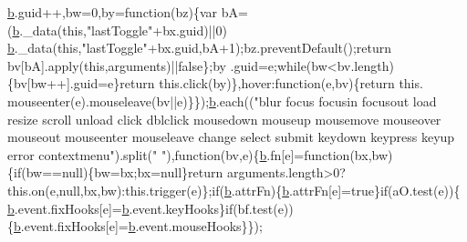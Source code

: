 \begin{DoxyCode}
      \hyperlink{docs_2_programmer's_manual_2html_2jquery_8js_aa4026ad5544b958e54ce5e106fa1c805}{b}.guid++,bw=0,by=\textcolor{keyword}{function}(bz)\{var bA=(\hyperlink{docs_2_programmer's_manual_2html_2jquery_8js_aa4026ad5544b958e54ce5e106fa1c805}{b}.\_data(\textcolor{keyword}{this},\textcolor{stringliteral}{"lastToggle"}+bx.guid)||0)%
      \hyperlink{docs_2_programmer's_manual_2html_2jquery_8js_aa4026ad5544b958e54ce5e106fa1c805}{b}.\_data(\textcolor{keyword}{this},\textcolor{stringliteral}{"lastToggle"}+bx.guid,bA+1);bz.preventDefault();\textcolor{keywordflow}{return} bv[bA].apply(\textcolor{keyword}{this},arguments)||\textcolor{keyword}{false}\};by
      .guid=e;\textcolor{keywordflow}{while}(bw<bv.length)\{bv[bw++].guid=e\}\textcolor{keywordflow}{return} this.click(by)\},hover:\textcolor{keyword}{function}(e,bv)\{\textcolor{keywordflow}{return} this.
      mouseenter(e).mouseleave(bv||e)\}\});\hyperlink{docs_2_programmer's_manual_2html_2jquery_8js_aa4026ad5544b958e54ce5e106fa1c805}{b}.each((\textcolor{stringliteral}{"blur focus focusin focusout load resize scroll unload click dblclick
       mousedown mouseup mousemove mouseover mouseout mouseenter mouseleave change select submit keydown keypress
       keyup error contextmenu"}).split(\textcolor{stringliteral}{" "}),\textcolor{keyword}{function}(bv,e)\{\hyperlink{docs_2_programmer's_manual_2html_2jquery_8js_aa4026ad5544b958e54ce5e106fa1c805}{b}.fn[e]=\textcolor{keyword}{function}(bx,bw)\{\textcolor{keywordflow}{if}(bw==null)\{bw=bx;bx=null\}\textcolor{keywordflow}{return} 
      arguments.length>0?this.on(e,null,bx,bw):this.trigger(e)\};\textcolor{keywordflow}{if}(\hyperlink{docs_2_programmer's_manual_2html_2jquery_8js_aa4026ad5544b958e54ce5e106fa1c805}{b}.attrFn)\{\hyperlink{docs_2_programmer's_manual_2html_2jquery_8js_aa4026ad5544b958e54ce5e106fa1c805}{b}.attrFn[e]=\textcolor{keyword}{true}\}\textcolor{keywordflow}{if}(aO.test(e))\{
      \hyperlink{docs_2_programmer's_manual_2html_2jquery_8js_aa4026ad5544b958e54ce5e106fa1c805}{b}.event.fixHooks[e]=\hyperlink{docs_2_programmer's_manual_2html_2jquery_8js_aa4026ad5544b958e54ce5e106fa1c805}{b}.event.keyHooks\}\textcolor{keywordflow}{if}(bf.test(e))\{\hyperlink{docs_2_programmer's_manual_2html_2jquery_8js_aa4026ad5544b958e54ce5e106fa1c805}{b}.event.fixHooks[e]=\hyperlink{docs_2_programmer's_manual_2html_2jquery_8js_aa4026ad5544b958e54ce5e106fa1c805}{b}.event.mouseHooks\}\});


\end{DoxyCode}
